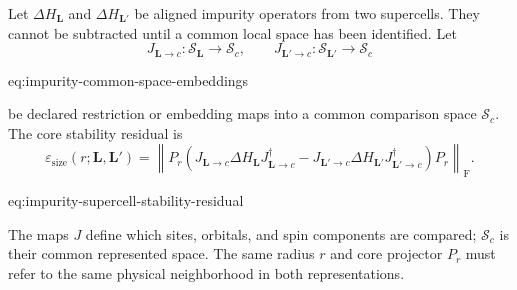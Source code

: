 Let $\Delta H_{\mathbf L}$ and $\Delta H_{\mathbf L'}$ be aligned impurity
operators from two supercells. They cannot be subtracted until a common local
space has been identified. Let
\begin{equation}
    J_{\mathbf L\to c}:\mathcal S_{\mathbf L}\longrightarrow\mathcal S_c,
    \qquad
    J_{\mathbf L'\to c}:\mathcal S_{\mathbf L'}\longrightarrow\mathcal S_c
    \label{eq:impurity-common-space-embeddings}
\end{equation}
\begin{equationterms}{eq:impurity-common-space-embeddings}
\end{equationterms}
be declared restriction or embedding maps into a common comparison space
$\mathcal S_c$. The core stability residual is
\begin{equation}
    \varepsilon_{\mathrm{size}}(r;\mathbf L,\mathbf L')
    =
    \left\lVert
      P_r
      \left(
        J_{\mathbf L\to c}\Delta H_{\mathbf L}J_{\mathbf L\to c}^{\dagger}
        -
        J_{\mathbf L'\to c}\Delta H_{\mathbf L'}J_{\mathbf L'\to c}^{\dagger}
      \right)
      P_r
    \right\rVert_{\mathrm F}.
    \label{eq:impurity-supercell-stability-residual}
\end{equation}
\begin{equationterms}{eq:impurity-supercell-stability-residual}
\end{equationterms}
The maps $J$ define which sites, orbitals, and spin components are compared;
$\mathcal S_c$ is their common represented space. The same radius $r$ and core
projector $P_r$ must refer to the same physical neighborhood in both
representations.

